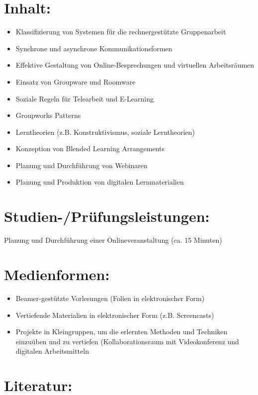 \section*{Inhalt:}\label{inhalt-13}

\begin{itemize}
\item
  Klassifizierung von Systemen für die rechnergestützte Gruppenarbeit
\item
  Synchrone und asynchrone Kommunikationsformen
\item
  Effektive Gestaltung von Online-Besprechungen und virtuellen
  Arbeitsräumen
\item
  Einsatz von Groupware und Roomware
\item
  Soziale Regeln für Telearbeit und E-Learning
\item
  Groupworks Patterns
\item
  Lerntheorien (z.B. Konstruktivismus, soziale Lerntheorien)
\item
  Konzeption von Blended Learning Arrangements
\item
  Planung und Durchführung von Webinaren
\item
  Planung und Produktion von digitalen Lernmaterialien
\end{itemize}

\section*{Studien-/Prüfungsleistungen:}\label{studien-pruxfcfungsleistungen-13}

Planung und Durchführung einer Onlineveranstaltung (ca. 15 Minuten)

\section*{Medienformen:}\label{medienformen-13}

\begin{itemize}
\item
  Beamer-gestützte Vorlesungen (Folien in elektronischer Form)
\item
  Vertiefende Materialien in elektronischer Form (z.B. Screencasts)
\item
  Projekte in Kleingruppen, um die erlernten Methoden und Techniken
  einzuüben und zu vertiefen (Kollaborationsraum mit Videokonferenz und
  digitalen Arbeitsmitteln
\end{itemize}

\section*{Literatur:}\label{literatur-10}

